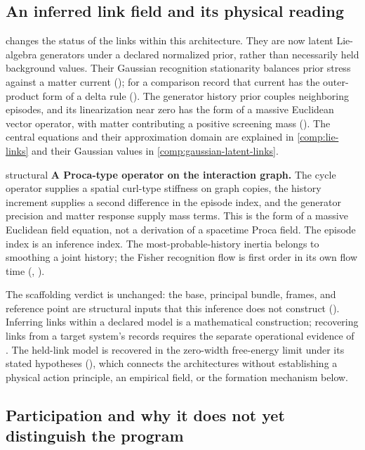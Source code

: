 \subsection{An inferred link field and its physical reading}

 changes the status of the links within this architecture. They are now latent
Lie-algebra generators under a declared normalized prior, rather than necessarily held background
values. Their Gaussian recognition stationarity balances prior stress against a matter current
(); for a comparison record that current has the outer-product form
of a delta rule (). The generator history prior couples neighboring
episodes, and its linearization near zero has the form of a massive Euclidean vector operator, with
matter contributing a positive screening mass (). The central
equations and their approximation domain are explained in \cref{comp:lie-links} and their Gaussian
values in \cref{comp:gaussian-latent-links}.

\begin{analogy}{structural}
\textbf{A Proca-type operator on the interaction graph.} The cycle operator supplies a spatial
curl-type stiffness on graph copies, the history increment supplies a second difference in the
episode index, and the generator precision and matter response supply mass terms. This is the
form of a massive Euclidean field equation, not a derivation of a spacetime Proca field. The
episode index is an inference index. The most-probable-history inertia belongs to smoothing a
joint history; the Fisher recognition flow is first order in its own flow time
(, ).
\end{analogy}

The scaffolding verdict is unchanged: the base, principal bundle, frames, and reference point are
structural inputs that this inference does not construct (). Inferring links
within a declared model is a mathematical construction; recovering links from a target system's
records requires the separate operational evidence of . The held-link
model is recovered in the zero-width free-energy limit under its stated hypotheses
(), which connects the architectures without establishing a physical
action principle, an empirical field, or the formation mechanism below.

\subsection{Participation and why it does not yet distinguish the program}

